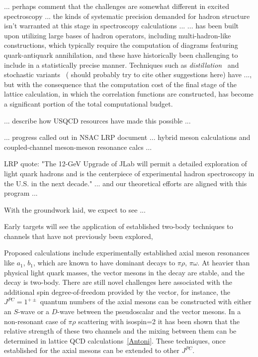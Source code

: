 {{... perhaps comment that the challenges are somewhat different in excited spectroscopy ... the kinds of systematic precision demanded for hadron structure isn't warranted at this stage in spectroscopy calculations ...  
}
... has been built upon utilizing large bases of hadron operators, including multi-hadron-like constructions, which typically require the computation of diagrams featuring quark-antiquark annihilation, and these have historically been challenging to include in a statistically precise manner. Techniques such as \emph{distillation}~\cite{Peardon:2009gh} and stochastic variants~\cite{Morningstar:2011ka} {\color{red}( should probably try to cite other suggestions here)} have {\color{red}...}, but with the consequence that the computation cost of the final stage of the lattice calculation, in which the correlation functions are constructed, has become a significant portion of the total computational budget.

{\color{red} ... describe how USQCD resources have made this possible ... }

{\color{red} ... progress called out in NSAC LRP document ... hybrid meson calculations and coupled-channel meson-meson resonance calcs ... }


LRP quote: "The 12-GeV Upgrade of JLab will permit a detailed exploration of light quark hadrons and is the centerpiece of experimental hadron spectroscopy in the U.S. in the next decade."  ... and our theoretical efforts are aligned with this program ...





With the groundwork laid, we expect to see ...

Early targets will see the application of established two-body techniques to channels that have not previously been explored,




Proposed calculations include experimentally established axial meson resonances like $a_1$, $b_1$, which are known to have dominant decays to $\pi \rho$, $\pi \omega$. At heavier than physical light quark masses, the vector mesons in the decay are stable, and the decay is two-body. There are still novel challenges here associated with the additional spin degree-of-freedom provided by the vector, for instance, the $J^{PC}=1^{+\pm}$ quantum numbers of the axial mesons can be constructed with either an $S$-wave or a $D$-wave between the pseudoscalar and the vector mesons. In a non-resonant case of $\pi \rho$ scattering with isospin=2 it has been shown that the relative strength of these two channels and the mixing between them can be determined in lattice QCD calculations~\ref{Antoni}. These techniques, once established for the axial mesons can be extended to other $J^{PC}$. 

}
